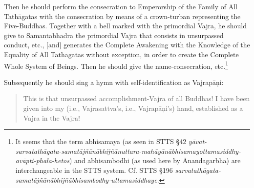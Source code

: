 \documentclass[11pt]{book}
\newcommand{\skt}[1]{\emph{#1}}
\begin{document}
Then he should perform the consecration to Emperorship of the Family of All Tathāgatas with the consecration by means of a crown-turban representing the Five-Buddhas. Together with a bell marked with the primordial Vajra, he should give to Samantabhadra the primordial Vajra that consists in unsurpassed conduct, etc., [and] generates the Complete Awakening with the Knowledge of the Equality of All Tathāgatas without exception, in order to create the Complete Whole System of Beings. Then he should give the name-consecration, etc.\footnote{It seems that the term abhisamaya (as seen in STTS §42 \skt{yāvat-sarvatathāgata-samatājñānābhijñānuttara-mahāyānābhisamayottamasiddhy-avāpti-phala-hetos}) and abhisambodhi (as used here by Ānandagarbha) are interchangeable in the STTS system. Cf. STTS §196 \skt{sarvatathāgata-samatājñānābhijñābhisambodhy-uttamasiddhaye}.}

Subsequently he should sing a hymn with self-identification as Vajrapāṇi:

\begin{verse}
This is that unsurpassed accomplishment-Vajra of all Buddhas! I have been given into my (i.e., Vajrasattva's, i.e., Vajrapāṇi's) hand, established as a Vajra in the Vajra! 
\end{verse}
\end{document}
